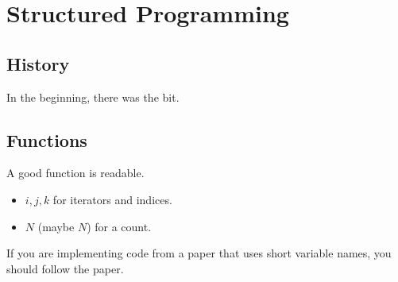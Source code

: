 \chapter{Structured Programming}

\section{History}

In the beginning, there was the bit.

\section{Functions}

A good function is readable.

\begin{itemize}
\item $i,j,k$ for iterators and indices.
\item $N$ (maybe $N$) for a count.
\end{itemize}

If you are implementing code from a paper that uses short variable names, you should follow the paper.

